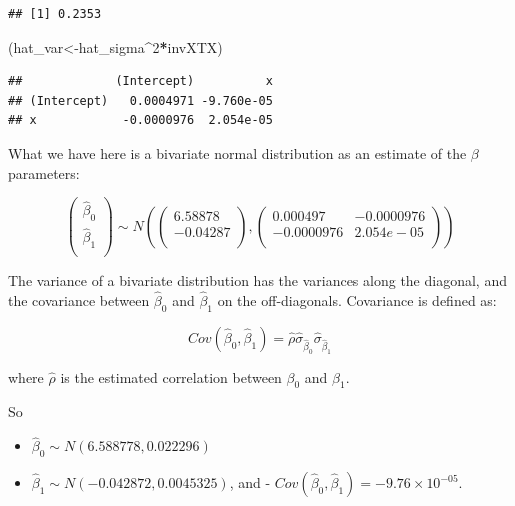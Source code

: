 \documentclass[12pt,]{krantz}
\newenvironment{Shaded}{\begin{snugshade}}{\end{snugshade}}
\newcommand{\DecValTok}[1]{\textcolor[rgb]{0.00,0.00,0.81}{#1}}
\newcommand{\NormalTok}[1]{#1}
\newcommand{\OperatorTok}[1]{\textcolor[rgb]{0.81,0.36,0.00}{\textbf{#1}}}
\providecommand{\tightlist}{%
  \setlength{\itemsep}{0pt}\setlength{\parskip}{0pt}}
\begin{document}
\begin{verbatim}
## [1] 0.2353
\end{verbatim}

\begin{Shaded}
\begin{Highlighting}[]
\NormalTok{(hat_var<-hat_sigma}\OperatorTok{^}\DecValTok{2}\OperatorTok{*}\NormalTok{invXTX)}
\end{Highlighting}
\end{Shaded}

\begin{verbatim}
##             (Intercept)          x
## (Intercept)   0.0004971 -9.760e-05
## x            -0.0000976  2.054e-05
\end{verbatim}

What we have here is a bivariate normal distribution as an estimate of the \(\beta\) parameters:

\begin{equation}
\begin{pmatrix}
\hat\beta_0\\
\hat\beta_1\\
\end{pmatrix}
\sim 
N(\begin{pmatrix}
6.58878\\
-0.04287\\
\end{pmatrix},
\begin{pmatrix}
 0.000497 & -0.0000976\\
-0.0000976 & 2.054e-05\\
\end{pmatrix})
\end{equation}

The variance of a bivariate distribution has the variances along the diagonal, and the covariance between \(\hat\beta_0\) and
\(\hat\beta_1\) on the off-diagonals. Covariance is defined as:

\begin{equation}
Cov(\hat\beta_0,\hat\beta_1)=\hat\rho \hat\sigma_{\hat\beta_0}\hat\sigma_{\hat\beta_1}
\end{equation}

where \(\hat\rho\) is the estimated correlation between \(\beta_0\) and \(\beta_1\).

So

\begin{itemize}
\tightlist
\item
  \(\hat\beta_0 \sim N(6.588778,0.022296)\)
\item
  \(\hat\beta_1 \sim N(-0.042872,0.0045325)\), and - \(Cov(\hat\beta_0,\hat\beta_1)=-9.76\times 10^{-05}\).
\end{itemize}
\end{document}
